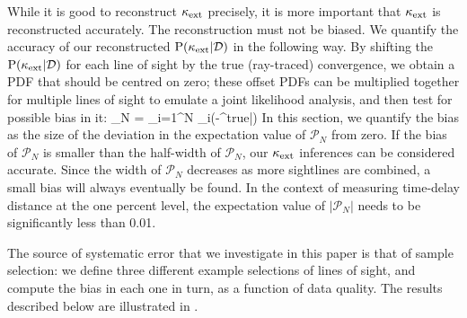\documentclass[useAMS,usenatbib,a4paper]{mn2e}
\begin{document}
While it is good to reconstruct $\kappa_{\rm ext}$ precisely, it is more important that
$\kappa_{\rm ext}$ is reconstructed accurately. The reconstruction must not be biased. 
We quantify the accuracy of our reconstructed ${\rm P}(\kappa_{\rm ext}|{\mathcal{D}})$ in the
following way. By shifting the \infered ${\rm P}(\kappa_{\rm ext}|{\mathcal{D}})$ for each line of
sight by the true (ray-traced) convergence, we obtain a  PDF that should be
centred on zero; these offset PDFs can be multiplied together for multiple
lines of sight to emulate a joint likelihood analysis, and then test for
possible bias in it:
\be
\label{eq:bias}
_N = \prod_{i=1}^N \pr_i(\kappax-\kappax^{\rm true}|\data)
\ee
In this section, we quantify the bias as the size of the deviation in the
expectation value of $\mathcal{P}_N$ from zero. If the bias of $\mathcal{P}_N$
is smaller than the half-width of $\mathcal{P}_N$, our $\kappa_{\rm ext}$ inferences
can be considered accurate. Since the width of $\mathcal{P}_N$ decreases as
more sightlines are combined, a small bias will always 
eventually be found. In the context of measuring time-delay distance at the 
one percent level, the expectation value of $|\mathcal{P}_N|$ needs to be 
significantly less than 0.01. 



The source of systematic error that we investigate in this paper  is that of
sample selection: we define three different example selections of lines of
sight, and compute the bias   in each one in turn, as a function of data quality. The results
described below are illustrated in .
\end{document}
